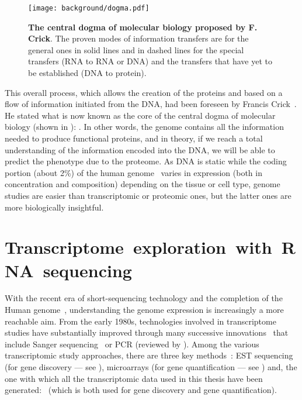 \begin{figure}[!htbp]
    \texttt{[image: background/dogma.pdf]}\centering
    \vspace{-4mm}
    \caption[Central dogma of molecular biology proposed by F. Crick]%
    {\label{fig:dogma}\textbf{The central dogma of molecular biology proposed by
    F. Crick}. The proven modes of information transfers are for the general ones
    in solid lines and in dashed lines for the special transfers
    (\gls{RNA} to \gls{RNA} or \gls{DNA}) and the transfers that have yet to
    be established (\gls{DNA} to protein).
    }
\end{figure}

This overall process, which allows the creation of the proteins and
based on a flow of information initiated from the \gls{DNA},
had been foreseen by Francis Crick~.
He stated what is now known as the core of the central dogma of molecular biology
(shown in ):
.
In other words, the genome contains all the information needed to produce
functional proteins,
and in theory, if we reach a total understanding of the information encoded
into the \gls{DNA},
we will be able to predict the \gls{phenotype} due to the proteome.
As \gls{DNA} is static
while the coding portion (about 2\%) of the human genome~
varies in expression (both in concentration and composition)
depending on the tissue or cell type,
genome studies are easier than transcriptomic or proteomic ones,
but the latter ones are more biologically insightful.
\begin{comment}
There are different types of proteins: ubiquitous ones
(generally qualified as \emph{housekeeping}),
cell/tissue/condition specific ones and
everything in-between.
\end{comment}

\section[Transcriptome exploration with RNA sequencing]%
{Transcriptome~exploration~with~RNA~sequencing}\label{sec:transExplo}

With the recent era of short-sequencing technology and the completion of the
Human genome~,
understanding the genome expression is increasingly a more
reachable aim.
From the early 1980s,
technologies involved in transcriptome studies
have substantially improved through many successive innovations~
that include Sanger sequencing~ or
\gls{PCR} (reviewed by \citet{VanGuilder2008-xs}).
Among the various transcriptomic study approaches,
there are three key methods~:
\gls{EST} sequencing (for gene discovery --- see ),
microarrays (for gene quantification --- see )
and, the one with which all the transcriptomic data used in this thesis have
been generated:
\Rnaseq\ (which is both used for gene discovery and gene quantification).

